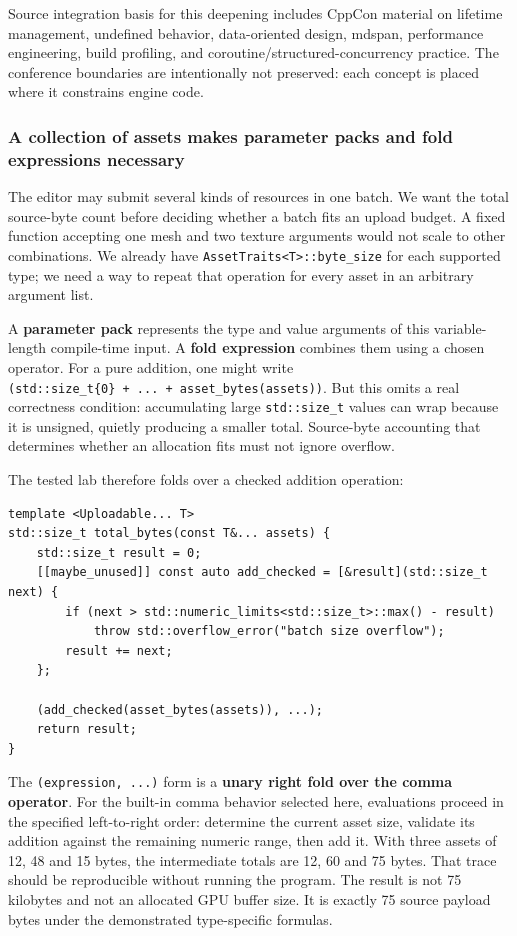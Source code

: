 Source integration basis for this deepening includes CppCon material on lifetime management, undefined behavior, data-oriented design, mdspan, performance engineering, build profiling, and coroutine/structured-concurrency practice. The conference boundaries are intentionally not preserved: each concept is placed where it constrains engine code.

\subsubsection{A collection of assets makes parameter packs and fold expressions necessary}\label{a-collection-of-assets-makes-parameter-packs-and-fold-expressions-necessary}

The editor may submit several kinds of resources in one batch. We want the total source-byte count before deciding whether a batch fits an upload budget. A fixed function accepting one mesh and two texture arguments would not scale to other combinations. We already have \texttt{AssetTraits\textless{}T\textgreater{}::byte\_size} for each supported type; we need a way to repeat that operation for every asset in an arbitrary argument list.

A \textbf{parameter pack} represents the type and value arguments of this variable-length compile-time input. A \textbf{fold expression} combines them using a chosen operator. For a pure addition, one might write \texttt{(std::size\_t\{0\}\ +\ ...\ +\ asset\_bytes(assets))}. But this omits a real correctness condition: accumulating large \texttt{std::size\_t} values can wrap because it is unsigned, quietly producing a smaller total. Source-byte accounting that determines whether an allocation fits must not ignore overflow.

The tested lab therefore folds over a checked addition operation:

\begin{verbatim}
template <Uploadable... T>
std::size_t total_bytes(const T&... assets) {
    std::size_t result = 0;
    [[maybe_unused]] const auto add_checked = [&result](std::size_t next) {
        if (next > std::numeric_limits<std::size_t>::max() - result)
            throw std::overflow_error("batch size overflow");
        result += next;
    };

    (add_checked(asset_bytes(assets)), ...);
    return result;
}
\end{verbatim}

The \texttt{(expression,\ ...)} form is a \textbf{unary right fold over the comma operator}. For the built-in comma behavior selected here, evaluations proceed in the specified left-to-right order: determine the current asset size, validate its addition against the remaining numeric range, then add it. With three assets of 12, 48 and 15 bytes, the intermediate totals are 12, 60 and 75 bytes. That trace should be reproducible without running the program. The result is not 75 kilobytes and not an allocated GPU buffer size. It is exactly 75 source payload bytes under the demonstrated type-specific formulas.

